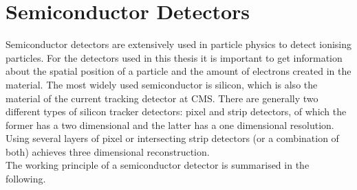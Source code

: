 \documentclass[british,11pt,a4paper]{memoir}
\begin{document}
\section{Semiconductor Detectors}
Semiconductor detectors are extensively used in particle physics to detect ionising particles. For the detectors used in this thesis it is important to get information about the spatial position of a particle and the amount of electrons created in the material. The most widely used semiconductor is silicon, which is also the material of the current tracking detector at \ac{CMS}. There are generally two different types of silicon tracker detectors: pixel and strip detectors, of which the former has a two dimensional and the latter has a one dimensional resolution. Using several layers of pixel or intersecting strip detectors (or a combination of both) achieves three dimensional reconstruction.\\
The working principle of a semiconductor detector is summarised in the following.
\end{document}
